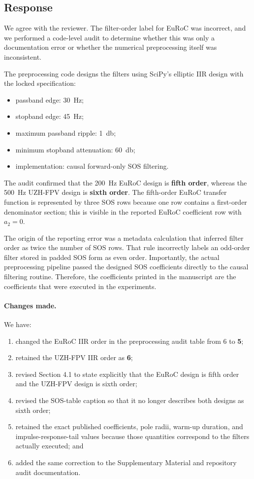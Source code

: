 \documentclass[12pt,a4paper]{article}
\begin{document}
\subsection*{Response}

We agree with the reviewer. The filter-order label for EuRoC was incorrect, and we performed a code-level audit to determine whether this was only a documentation error or whether the numerical preprocessing itself was inconsistent.

The preprocessing code designs the filters using SciPy's elliptic IIR design with the locked specification:
\begin{itemize}[leftmargin=*]
    \item passband edge: \SI{30}{\hertz};
    \item stopband edge: \SI{45}{\hertz};
    \item maximum passband ripple: \SI{1}{\decibel};
    \item minimum stopband attenuation: \SI{60}{\decibel};
    \item implementation: causal forward-only SOS filtering.
\end{itemize}

The audit confirmed that the \SI{200}{\hertz} EuRoC design is \textbf{fifth order}, whereas the \SI{500}{\hertz} UZH-FPV design is \textbf{sixth order}. The fifth-order EuRoC transfer function is represented by three SOS rows because one row contains a first-order denominator section; this is visible in the reported EuRoC coefficient row with $a_2=0$.

The origin of the reporting error was a metadata calculation that inferred filter order as twice the number of SOS rows. That rule incorrectly labels an odd-order filter stored in padded SOS form as even order. Importantly, the actual preprocessing pipeline passed the designed SOS coefficients directly to the causal filtering routine. Therefore, the coefficients printed in the manuscript are the coefficients that were executed in the experiments.

\paragraph{Changes made.}
We have:
\begin{enumerate}[leftmargin=*]
    \item changed the EuRoC IIR order in the preprocessing audit table from 6 to \textbf{5};
    \item retained the UZH-FPV IIR order as \textbf{6};
    \item revised Section 4.1 to state explicitly that the EuRoC design is fifth order and the UZH-FPV design is sixth order;
    \item revised the SOS-table caption so that it no longer describes both designs as sixth order;
    \item retained the exact published coefficients, pole radii, warm-up duration, and impulse-response-tail values because those quantities correspond to the filters actually executed; and
    \item added the same correction to the Supplementary Material and repository audit documentation.
\end{enumerate}
\end{document}
